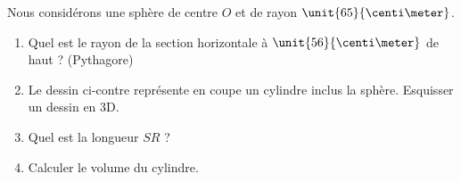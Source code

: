 
\begin{exercice}\label{exosmath-0094}

    Nous considérons une sphère de centre \( O\) et de rayon \( \unit{65}{\centi\meter}\).
    \begin{multicols}{2}
        \begin{enumerate}
            \item
                Quel est le rayon de la section horizontale à \( \unit{56}{\centi\meter}\) de haut ? (Pythagore)
            \item
                Le dessin ci-contre représente en coupe un cylindre inclus la sphère. Esquisser un dessin en 3D.
            \item
                Quel est la longueur \( SR\) ?
            \item
                Calculer le volume du cylindre.
        \end{enumerate}

        \columnbreak
        \begin{center}

        \end{center}


    \end{multicols}

\end{exercice}
